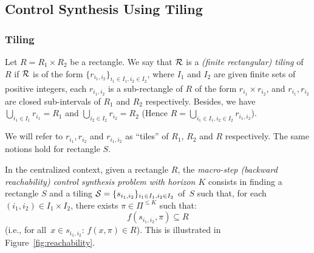 \subsection{Control Synthesis Using Tiling}\label{sec:tiling}
\subsubsection{Tiling}\label{ss:cent0}
Let $R=R_1\times R_2$
be a rectangle.
We say that $\cal  R$
is a \emph{(finite rectangular) tiling} of
$R$ if $\cal  R$ is of the form
$\{r_{i_1,i_2}\}_{i_1\in I_1, i_2\in I_2}$,
where 
$I_1$ and $I_2$ are given finite sets of positive integers, 
each $r_{i_1,i_2}$ is a sub-rectangle of $R$ of the form
$r_{i_1}\times r_{i_2}$, and $r_{i_1}, r_{i_2}$ 
are closed sub-intervals of $R_1$
and $R_2$ respectively. Besides, we have
$\bigcup_{i_1\in I_1}r_{i_1}=R_1$ and
$\bigcup_{i_2\in I_2}r_{i_2}=R_2$
(Hence $R=\bigcup_{i_1\in I_1, i_2\in I_2}r_{i_1,i_2}$).

We will refer to $r_{i_1}, r_{i_2}$ and $r_{i_1,i_2}$
as ``tiles'' of $R_1$, $R_2$ and $R$ respectively.
The same notions hold for rectangle $S$.


In the centralized context, given a rectangle $R$,
the \emph{macro-step (backward reachability) control synthesis problem
with horizon $K$}
consists in finding a rectangle $S$
and a tiling ${\cal  S}=\{s_{i_1,i_2}\}_{i_1\in I_1, i_2\in I_2}$ of~$S$
such that, for each ${(i_1,i_2)\in I_1\times I_2}$,
there exists $\pi\in \Pi^{\leq K}$ such that:
\[
f(s_{i_1,i_2},\pi)\subseteq R
\]
(i.e., 
for all~$x\in s_{i_1,i_2}$:
$f(x,\pi)\in R$).
%
This is illustrated in Figure~\ref{fig:reachability}.

